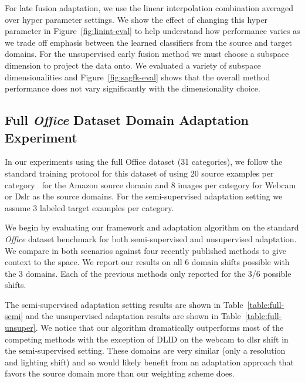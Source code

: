  For late fusion adaptation, we use the linear interpolation combination averaged over hyper parameter settings. We show the effect of changing this hyper parameter in Figure~\ref{fig:linint-eval} to help understand how performance varies as we trade off emphasis between the learned classifiers from the source and target domains. 
  For the unsupervised early fusion method we must choose a subspace dimension to project the data onto. We evaluated a variety of
  subspace dimensionalities and Figure~\ref{fig:sagfk-eval} shows that the overall method performance does not vary significantly with the dimensionality choice.

\subsection{Full \emph{Office} Dataset Domain Adaptation Experiment}
In our experiments using the full Office dataset (31 categories),
we follow the standard training protocol for this dataset of using 20 source
examples per category~\cite{saenko-eccv10,gong-cvpr12}
 for the Amazon source domain and 8 images per category for Webcam or
 Dslr as the source domains. For the semi-supervised adaptation setting 
 we assume 3 labeled target examples per category.


We begin by evaluating our framework and adaptation algorithm on the standard \emph{Office} dataset benchmark
for both semi-supervised and unsupervised adaptation. We compare in both scenarios against four recently published methods
to give context to the space. We report our results on all 6 domain shifts possible with the 3 domains. Each of the previous methods only reported for the 3/6 possible shifts. 

The semi-supervised adaptation setting results are shown in Table~\ref{table:full-semi} and the unsupervised adaptation results are shown in Table~\ref{table:full-unsuper}. We notice that our algorithm dramatically outperforms most of the competing methods with the exception of DLID on the webcam to dlsr shift in the semi-supervised setting. These domains are very similar (only a resolution and lighting shift) and so would likely benefit from an adaptation approach that favors the source domain more than our weighting scheme does. 

